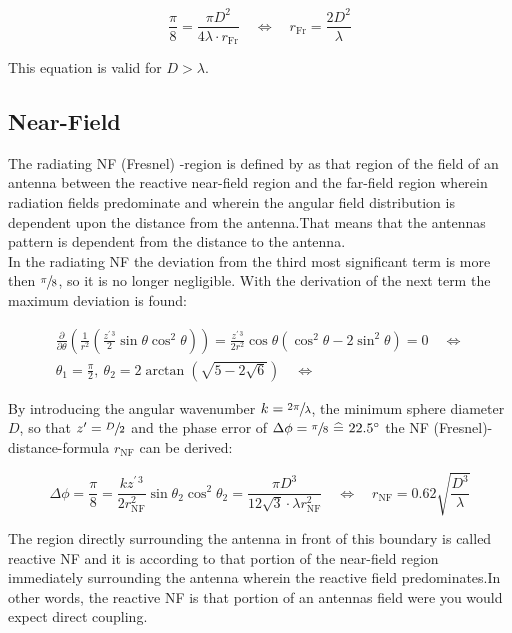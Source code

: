 \begin{equation}
\frac{\pi}{8} = \frac{\pi D^2}{4\lambda\cdot r_{\text{Fr}}} \quad \Leftrightarrow \quad r_{\text{Fr}} = \frac{2D^2}{\lambda}
\label{eq:ff}
\end{equation}

This equation is valid for $D > \lambda$. \cite{balanis}

\subsection{Near-Field}

The radiating \ac{NF} (Fresnel) -region is defined by \cite{balanis} as \glqq that region of the field of an antenna between the reactive near-field region and the far-field region wherein radiation fields predominate and wherein the angular field distribution is dependent upon the distance from the antenna.\grqq{ }That means that the antennas pattern is dependent from the distance to the antenna.\\
In the radiating \ac{NF} the deviation from the third most significant term is more then $\sfrac{\pi}{8}$, so it is no longer negligible. With the derivation of the next term the maximum deviation is found:

\begin{align}
\frac{\partial}{\partial\theta}\left(\frac{1}{r^2}\left(\frac{z^{\prime\, 3}}{2}\sin\theta\cos^2\theta\right)\right) = \frac{z^{\prime\, 3}}{2r^2}\cos\theta\left(\cos^2\theta-2\sin^2\theta\right) = 0 \quad \Leftrightarrow\\ 
\theta_1 = \frac{\pi}{2},\ \theta_2=2\arctan\left(\sqrt{5-2\sqrt{6}}\right) \quad \Leftrightarrow
\end{align}

By introducing the angular wavenumber $k=\sfrac{2\pi}{\lambda}$, the minimum sphere diameter $D$, so that $z'=\sfrac{D}{2}$ and the phase error of $\Delta\phi = \sfrac{\pi}{8} \ \widehat{=}\  22.5^\circ$ the \ac{NF} (Fresnel)-distance-formula $r_{\text{NF}}$ can be derived:

\begin{equation}
\Delta\phi = \frac{\pi}{8} = \frac{kz^{\prime\, 3}}{2r_{\text{NF}}^2}\sin\theta_2\cos^2\theta_2= \frac{\pi D^3}{12\sqrt{3}\cdot\lambda r_{\text{NF}}^2} \quad \Leftrightarrow \quad r_{\text{NF}}=0.62\sqrt{\frac{D^3}{\lambda}}
\end{equation}

The region directly surrounding the antenna in front of this boundary is called reactive \ac{NF} and it is according to \cite{balanis} \glqq that portion of the near-field region immediately surrounding the antenna wherein the reactive field predominates.\grqq{ }In other words, the reactive \ac{NF} is that portion of an antennas field were you would expect direct coupling.


